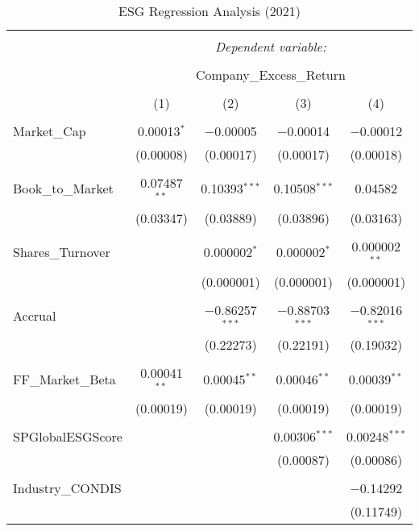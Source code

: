 
\begin{table}[!htbp] \centering 
  \caption{ESG Regression Analysis (2021)} 
  \label{} 
\begin{tabular}{@{\extracolsep{5pt}}lcccc} 
\\[-1.8ex]\hline 
\hline \\[-1.8ex] 
 & \multicolumn{4}{c}{\textit{Dependent variable:}} \\ 
\cline{2-5} 
\\[-1.8ex] & \multicolumn{4}{c}{Company\_Excess\_Return} \\ 
\\[-1.8ex] & (1) & (2) & (3) & (4)\\ 
\hline \\[-1.8ex] 
 Market\_Cap & 0.00013$^{*}$ & $-$0.00005 & $-$0.00014 & $-$0.00012 \\ 
  & (0.00008) & (0.00017) & (0.00017) & (0.00018) \\ 
  & & & & \\ 
 Book\_to\_Market & 0.07487$^{**}$ & 0.10393$^{***}$ & 0.10508$^{***}$ & 0.04582 \\ 
  & (0.03347) & (0.03889) & (0.03896) & (0.03163) \\ 
  & & & & \\ 
 Shares\_Turnover &  & 0.000002$^{*}$ & 0.000002$^{*}$ & 0.000002$^{**}$ \\ 
  &  & (0.000001) & (0.000001) & (0.000001) \\ 
  & & & & \\ 
 Accrual &  & $-$0.86257$^{***}$ & $-$0.88703$^{***}$ & $-$0.82016$^{***}$ \\ 
  &  & (0.22273) & (0.22191) & (0.19032) \\ 
  & & & & \\ 
 FF\_Market\_Beta & 0.00041$^{**}$ & 0.00045$^{**}$ & 0.00046$^{**}$ & 0.00039$^{**}$ \\ 
  & (0.00019) & (0.00019) & (0.00019) & (0.00019) \\ 
  & & & & \\ 
 SPGlobalESGScore &  &  & 0.00306$^{***}$ & 0.00248$^{***}$ \\ 
  &  &  & (0.00087) & (0.00086) \\ 
  & & & & \\ 
 Industry\_CONDIS &  &  &  & $-$0.14292 \\ 
  &  &  &  & (0.11749) \\ 

\end{tabular}
\end{table}
